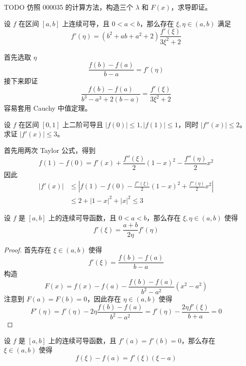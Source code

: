 \begin{solution}
	TODO 仿照 000035 的计算方法，构造三个 $\lambda$ 和 $F(x)$，求导即证。
\end{solution}

\begin{problem}[000038]
设 $f$ 在区间 $[a, b]$ 上连续可导，且 $0 < a < b$，那么存在 $\xi, \eta \in (a, b)$ 满足
\[ f'(\eta) = (b^2 + ab + a^2 + 2)\frac{f'(\xi)}{3 \xi^2 + 2} \]
\end{problem}

\begin{solution}
	首先选取 $\eta$
	\[ \frac{f(b) - f(a)}{b - a} = f'(\eta) \]
	接下来即证
	\[ \frac{f(b) - f(a)}{b^3 - a^3 + 2(b - a)} = \frac{f'(\xi)}{3\xi^2 + 2} \]
	容易套用 Cauchy 中值定理。
\end{solution}

\begin{problem}[000039]
设 $f$ 在区间 $[0, 1]$ 上二阶可导且 $|f(0)| \leqslant 1, |f(1)| \leqslant 1$，同时 $|f''(x)| \leqslant 2$。求证 $|f'(x)| \leqslant 3$。
\end{problem}

\begin{solution}
	首先用两次 Taylor 公式，得到
	\[ f(1) - f(0) = f'(x) + \frac{f''(\xi)}{2}(1 - x)^2 - \frac{f''(\eta)}{2}x^2 \]
	因此
	\[ \begin{aligned}
			|f'(x)| & \leqslant \left| f(1) - f(0) - \frac{f''(\xi)}{2}(1 - x)^2 + \frac{f''(\eta)}{2}x^2 \right| \\
			        & \leqslant 2 + |1-x|^2 + |x|^2 \leqslant 3
		\end{aligned} \]
\end{solution}

\begin{problem}[000040]
设 $f$ 是 $[a,b]$ 上的连续可导函数，且 $0 < a < b$，那么存在 $\xi, \eta \in (a,b)$ 使得
\[ f'(\xi) = \frac{a+b}{2\eta}f'(\eta) \]
\end{problem}

\begin{proof}
	首先存在 $\xi \in (a,b)$ 使得
	\[ f'(\xi) = \frac{f(b) - f(a)}{b - a} \]
	构造
	\[ F(x) = f(x) - f(a) - \frac{f(b) - f(a)}{b^2 - a^2}(x^2 - a^2) \]
	注意到 $F(a) = F(b) = 0$，因此存在 $\eta \in (a, b)$ 使得
	\[ F'(\eta) = f'(\eta) - 2 \eta \frac{f(b) - f(a)}{b^2 - a^2} = f'(\eta) - \frac{2 \eta f'(\xi)}{b + a} = 0 \]
\end{proof}

\begin{problem}[000041]
设 $f$ 是 $[a,b]$ 上的连续可导函数，且 $f'(a) = f'(b) = 0$，那么存在 $\xi \in (a,b)$ 使得
\[ f(\xi) - f(a) = f'(\xi)(\xi - a) \]
\end{problem}

